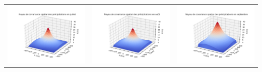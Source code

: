 \documentclass[a4paper,11pt]{article}
\begin{document}
\hspace{-3cm}
\begin{tabular}{ccc}
	\includegraphics[scale=0.4]{images/kernel_precip_m7.png} & \includegraphics[scale=0.4]{images/kernel_precip_m8.png} & \includegraphics[scale=0.4]{images/kernel_precip_m9.png} \\ 

\end{tabular}
\end{document}
